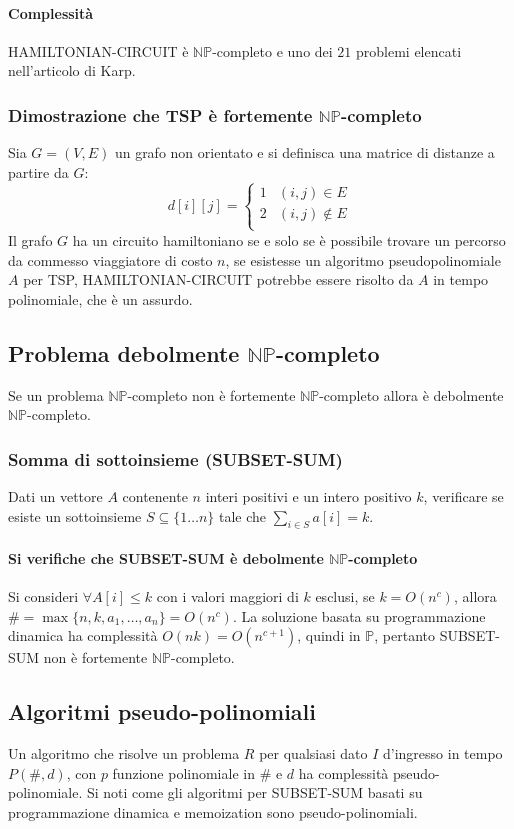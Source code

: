 \paragraph{Complessit\`a}
HAMILTONIAN-CIRCUIT \`e $\mathbb{NP}$-completo e uno dei $21$ problemi elencati nell'articolo di Karp.
\subsubsection{Dimostrazione che TSP \`e fortemente $\mathbf{\mathbb{NP}}$-completo}
Sia $G=(V, E)$ un grafo non orientato e si definisca una matrice di distanze a partire da $G$:
$$d[i][j] = 
\begin{cases}
	1 & (i, j)\in E\\
	2 & (i, j)\not\in E\\
\end{cases}$$
Il grafo $G$ ha un circuito hamiltoniano se e solo se \`e possibile trovare un percorso da commesso viaggiatore di costo $n$, se esistesse un algoritmo pseudopolinomiale $A$ per TSP, 
HAMILTONIAN-CIRCUIT potrebbe essere risolto da $A$ in tempo polinomiale, che \`e un assurdo.
\subsection{Problema debolmente $\mathbf{\mathbb{NP}}$-completo}
Se un problema $\mathbb{NP}$-completo non \`e fortemente $\mathbb{NP}$-completo allora \`e debolmente $\mathbb{NP}$-completo.
\subsubsection{Somma di sottoinsieme (SUBSET-SUM)}
Dati un vettore $A$ contenente $n$ interi positivi e un intero positivo $k$, verificare se esiste un sottoinsieme $S\subseteq\{1\dots n\}$ tale che $\sum\limits_{i\in S}a[i] = k$.
\paragraph{Si verifiche che SUBSET-SUM \`e debolmente $\mathbf{\mathbb{NP}}$-completo}
Si consideri $\forall A[i]\le k$ con i valori maggiori di $k$ esclusi, se $k=O(n^c)$, allora $\# = \max\{n, k, a_1,\dots, a_n\}=O(n^c)$. La soluzione basata su programmazione dinamica
ha complessit\`a $O(nk)=O(n^{c+1})$, quindi in $\mathbb{P}$, pertanto SUBSET-SUM non \`e fortemente $\mathbb{NP}$-completo. 
\subsection{Algoritmi pseudo-polinomiali}
Un algoritmo che risolve un problema $R$ per qualsiasi dato $I$ d'ingresso in tempo $P(\#, d)$, con $p$ funzione polinomiale in $\#$ e $d$ ha complessit\`a pseudo-polinomiale. Si noti
come gli algoritmi per SUBSET-SUM basati su programmazione dinamica e memoization sono pseudo-polinomiali. 
